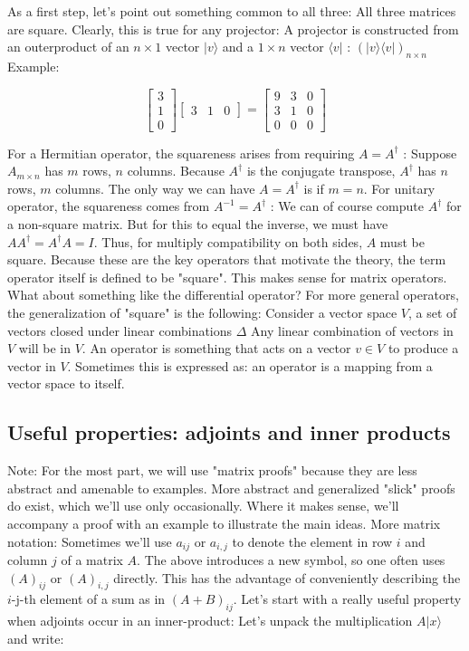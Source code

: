 \documentclass[main.tex]{subfiles}
\begin{document}
    As a first step, let's point out something common to all three: All three matrices are square. Clearly, this is true for any projector: A projector is constructed from an outerproduct of an $n \times 1$ vector $|v\rangle$ and a $1 \times n$ vector $\langle v|$ : $(|v\rangle\langle v|)_{n \times n}$ Example:
    
    $$
    \left[\begin{array}{l}
    3 \\
    1 \\
    0
    \end{array}\right]\left[\begin{array}{lll}
    3 & 1 & 0
    \end{array}\right]=\left[\begin{array}{lll}
    9 & 3 & 0 \\
    3 & 1 & 0 \\
    0 & 0 & 0
    \end{array}\right]
    $$
    
    For a Hermitian operator, the squareness arises from requiring $A=A^{\dagger}$ : Suppose $A_{m \times n}$ has $m$ rows, $n$ columns. Because $A^{\dagger}$ is the conjugate transpose, $A^{\dagger}$ has $n$ rows, $m$ columns. The only way we can have $A=A^{\dagger}$ is if $m=n$. For unitary operator, the squareness comes from $A^{-1}=A^{\dagger}$ : We can of course compute $A^{\dagger}$ for a non-square matrix. But for this to equal the inverse, we must have $A A^{\dagger}=A^{\dagger} A=I$. Thus, for multiply compatibility on both sides, $A$ must be square. Because these are the key operators that motivate the theory, the term operator itself is defined to be "square". This makes sense for matrix operators. What about something like the differential operator? For more general operators, the generalization of "square" is the following: Consider a vector space $V$, a set of vectors closed under linear combinations $\Delta$ Any linear combination of vectors in $V$ will be in $V$. An operator is something that acts on a vector $v \in V$ to produce a vector in $V$. Sometimes this is expressed as: an operator is a mapping from a vector space to itself.

\subsection{Useful properties: adjoints and inner products}

    Note: For the most part, we will use "matrix proofs" because they are less abstract and amenable to examples. More abstract and generalized "slick" proofs do exist, which we'll use only occasionally. Where it makes sense, we'll accompany a proof with an example to illustrate the main ideas. More matrix notation: Sometimes we'll use $a_{i j}$ or $a_{i, j}$ to denote the element in row $i$ and column $j$ of a matrix $A$. The above introduces a new symbol, so one often uses $(A)_{i j}$ or $(A)_{i, j}$ directly. This has the advantage of conveniently describing the $i$-j-th element of a sum as in $(A+B)_{i j}$. Let's start with a really useful property when adjoints occur in an inner-product: Let's unpack the multiplication $A|x\rangle$ and write:
    
\end{document}
